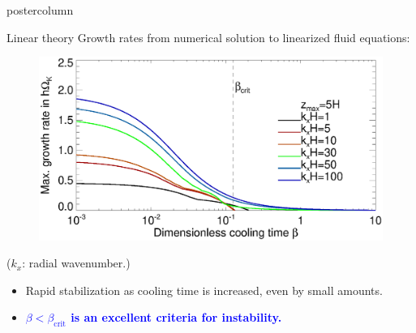 \documentclass[final,hyperref={pdfpagelabels=false}]{beamer}
\begin{document}
\begin{frame}
\begin{columns}
\begin{column}{.49\textwidth}
\begin{beamercolorbox}[center,wd=\textwidth]{postercolumn}
\begin{minipage}[T]{.95\textwidth}
{            \begin{block}{\Large Linear theory}
              \justifying
              Growth rates from numerical solution to linearized fluid
              equations:\\
              \vspace{-1cm}
              \begin{figure}
                 \includegraphics[width=\linewidth]{figures/gcorr_compare_iso_maxrate_z5.ps}%
               \end{figure}
               \vspace{-1cm}
               ($k_x$: radial wavenumber.)
               \begin{itemize}
               \item Rapid stabilization as cooling time is increased,
                 even by small amounts.
               \item \textcolor{blue}{\bf{$\beta<\beta_\mathrm{crit}$ 
                   is an excellent criteria for instability.}}
               \end{itemize}
            \end{block}
            \vfill
              

              
          }
        \end{minipage}
      \end{beamercolorbox}
    \end{column}
    

\end{columns}
\end{frame}
\end{document}
